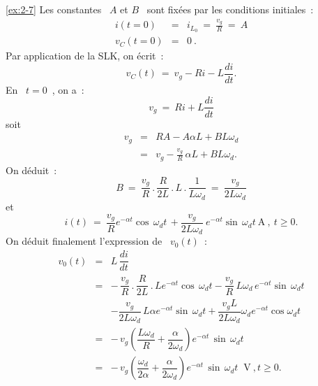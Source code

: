 \begin{solexercise}{\ref{ex:2-7}}
Les constantes \ $A$ et $B$ \ sont fix\'ees par les conditions initiales~:
\begin{eqnarray*}
	i(t=0) &=& i_{L_0} \: = \: \frac{v_g}{R}\: = \: A\\
	v_C(t=0) &=& 0~.
\end{eqnarray*}
Par application de la SLK, on \'ecrit~:
\[ v_C(t) \: = \: v_g - Ri - L\dfrac{di}{dt}. \]
En \ $t=0$~, on a~:
\[ v_g \: = \: Ri + L\dfrac{di}{dt} \]
soit
\begin{eqnarray*}
	v_g &=& RA - A\alpha L + BL\omega_d\\
	&=& v_g - \frac{v_g}{R} \, \alpha L + BL\omega_d.
\end{eqnarray*}
On d\'eduit~:
\[ B \: = \: \dfrac{v_g}{R} \, . \, \dfrac{R}
{2L} \, . \,L \, . \, \dfrac{1}{L\omega_d} \: = \: \dfrac{v_g}{2L\omega_d} \] 
et
\[ i(t) \: = \: \dfrac{v_g}{R} e^{-\alpha t}  \cos \, \omega_d t \,  +
\dfrac{v_g}{2L\omega_d} \:  e^{-\alpha t}  \sin \, \omega_d t ~\mbox{A}~, ~t\geq 0. \]
On d\'eduit finalement l'expression de \ $v_0(t)$~:
\begin{eqnarray*}
	v_0(t) &=& L \, \dfrac{di}{dt}\\[2mm]
	&=& -\, \dfrac{v_g}{R} \, . \, \dfrac{R}{2L} \, . \, L e^{-\alpha t} \cos \, \omega_d t 
	- \dfrac{v_g}{R} \, L\omega_d \, e^{-\alpha t} \sin \, \omega_d t\\[2mm]
	&&- \dfrac{v_g}{2L\omega_d} \, L \alpha  e^{-\alpha t} \sin\, \omega_d t 
	+ \dfrac{v_gL}{2L\omega_d}\omega_d e^{-\alpha t} \cos \omega_d t \\[2mm]
	&= & -\, v_g \left( \dfrac{L\omega_d}{R} + \dfrac{\alpha}{2\omega_d} \right) 
	e^{-\alpha t} \, \sin\, \omega_d t\\[2mm]
	&=& -\, v_g \left( \dfrac{\omega_d}{2\alpha} + 
	\dfrac{\alpha}{2\omega_d} \right) e^{-\alpha t} \, \sin\, \omega_d t ~\mbox{~V}~, t \geq 0.
\end{eqnarray*}
\end{solexercise}

